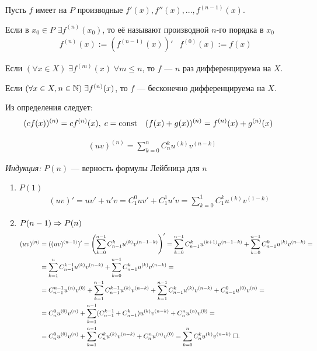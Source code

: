 \documentclass{article}
\begin{document}


Пусть $f$ имеет на $P$ производные $f'(x),f''(x),...,f^{(n-1)}(x)$.

Если в $x_0\in P$ $\exists f^{(n)}(x_0)$, то её называют производной $n$-го порядка в $x_0$
\begin{align*}
	 & f^{(n)}(x):=(f^{(n-1)}(x))' & f^{(0)}(x):=f(x)
\end{align*}


Если $(\forall x\in X)\;\exists f^{(m)}(x)\;\forall m\leq n$, то $f$ --- $n$ раз дифференцируема на $X$.

Если $(\forall x\in X, n\in\N)\;\exists f^{(n)}(x)$, то $f$ --- бесконечно дифференцируема на $X$.


Из определения следует:
\begin{align*}
	 & (cf(x))^{(n)}=cf^{(n)}(x),\; c = \const &  & (f(x)+g(x))^{(n)}=f^{(n)}(x)+g^{(n)}(x)
\end{align*}

\begin{align*}
	(uv)^{(n)}=\sum_{k=0}^{n}C_n^{k}u^{(k)}v^{(n-k)}
\end{align*}

\proof

{\it Индукция:} $P(n)$ --- верность формулы Лейбница для $n$
\begin{enumerate}
	\item{}$P(1)$
	\begin{align*}
		(uv)'=uv'+u'v=C_1^{0}uv'+C_1^{1}u'v=\sum_{k=0}^{1}C_1^{k}u^{(k)}v^{(1-k)}
	\end{align*}

	\item{}$P(n-1)\Rarr P(n)$
	\begin{align*}
		(uv)^{(n)}
		 & =((uv)^{(n-1)})'=\left(\sum_{k=0}^{n-1}C_{n-1}^{k}u^{(k)}v^{(n-1-k)}\right)'
		=\sum_{k=0}^{n-1}C_{n-1}^{k}u^{(k+1)}v^{(n-1-k)}+\sum_{k=0}^{n-1}C_{n-1}^{k}u^{(k)}v^{(n-k)}=                                                        \\
		 & =\sum_{k=1}^{n}C_{n-1}^{k-1}u^{(k)}v^{(n-k)}+\sum_{k=0}^{n-1}C_{n-1}^{k}u^{(k)}v^{(n-k)}=                                                         \\
		 & =C_{n-1}^{n-1}u^{(n)}v^{(0)}+\sum_{k=1}^{n-1}C_{n-1}^{k-1}u^{(k)}v^{(n-k)}+\sum_{k=1}^{n-1}C_{n-1}^{k}u^{(k)}v^{(n-k)}+C_{n-1}^{0}u^{(0)}v^{(n)}= \\
		 & =C_{n}^{0}u^{(0)}v^{(n)}+\sum_{k=1}^{n-1}(C_{n-1}^{k-1}+C_{n-1}^{k})u^{(k)}v^{(n-k)}+C_{n}^{n}u^{(n)}v^{(0)}=                                     \\
		 & =C_{n}^{0}u^{(0)}v^{(n)}+\sum_{k=1}^{n-1}C_n^{k}u^{(k)}v^{(n-k)}+C_{n}^{n}u^{(n)}v^{(0)}=\sum_{k=0}^{n}C_n^{k}u^{(k)}v^{(n-k)}\qed
	\end{align*}
\end{enumerate}
\end{document}
